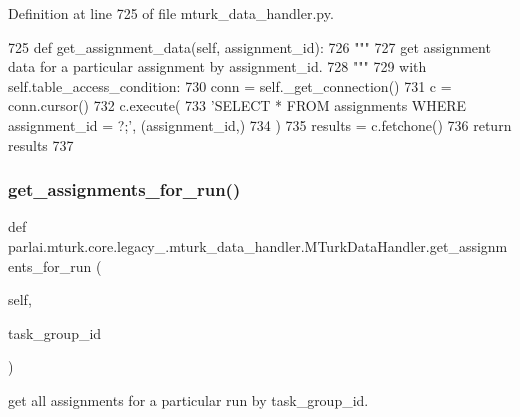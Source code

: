 Definition at line 725 of file mturk\+\_\+data\+\_\+handler.\+py.


\begin{DoxyCode}
725     \textcolor{keyword}{def }get\_assignment\_data(self, assignment\_id):
726         \textcolor{stringliteral}{"""}
727 \textcolor{stringliteral}{        get assignment data for a particular assignment by assignment\_id.}
728 \textcolor{stringliteral}{        """}
729         with self.table\_access\_condition:
730             conn = self.\_get\_connection()
731             c = conn.cursor()
732             c.execute(
733                 \textcolor{stringliteral}{'SELECT * FROM assignments WHERE assignment\_id = ?;'}, (assignment\_id,)
734             )
735             results = c.fetchone()
736             \textcolor{keywordflow}{return} results
737 
\end{DoxyCode}
\mbox{\label{classparlai_1_1mturk_1_1core_1_1legacy__2018_1_1mturk__data__handler_1_1MTurkDataHandler_a4a1d5f9b4aed51ba98d4979317ef9329}} 
\subsubsection{\texorpdfstring{get\+\_\+assignments\+\_\+for\+\_\+run()}{get\_assignments\_for\_run()}}
{\footnotesize\ttfamily def parlai.\+mturk.\+core.\+legacy\+\_.\+mturk\+\_\+data\+\_\+handler.\+M\+Turk\+Data\+Handler.\+get\+\_\+assignments\+\_\+for\+\_\+run (\begin{DoxyParamCaption}\item[{}]{self,  }\item[{}]{task\+\_\+group\+\_\+id }\end{DoxyParamCaption})}

\begin{DoxyVerb}get all assignments for a particular run by task_group_id.
\end{DoxyVerb}
 

